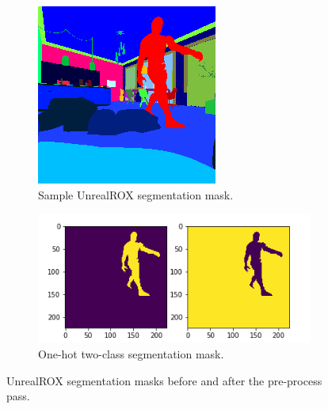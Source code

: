 \begin{figure}[h]
	\centering
	\begin{subfigure}[b]{0.4\textwidth}
		\includegraphics[width=1\linewidth]{archivos/rox_mask.png}
			\caption{Sample UnrealROX segmentation mask.}
	\end{subfigure}
	
	\begin{subfigure}[b]{0.6\textwidth}
		\includegraphics[width=1\linewidth]{archivos/onehot_mask.png}
		\caption{One-hot two-class segmentation mask.}
	\end{subfigure}
	
	\caption{UnrealROX segmentation masks before and after the pre-process pass.}
	\label{fig:rox-onehot}
\end{figure}


